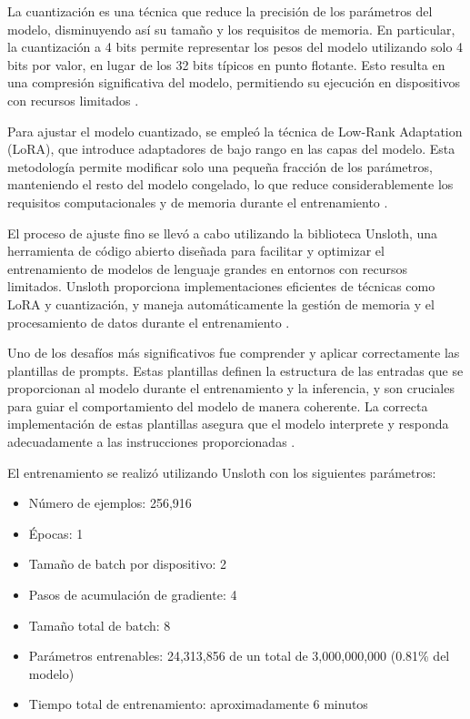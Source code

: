 \documentclass[../main.tex]{subfiles}
\begin{document}
La cuantización es una técnica que reduce la precisión de los parámetros del modelo, disminuyendo así su tamaño y los requisitos de memoria. En particular, la cuantización a 4 bits permite representar los pesos del modelo utilizando solo 4 bits por valor, en lugar de los 32 bits típicos en punto flotante. Esto resulta en una compresión significativa del modelo, permitiendo su ejecución en dispositivos con recursos limitados \parencite{huggingface_4bit}.

Para ajustar el modelo cuantizado, se empleó la técnica de Low-Rank Adaptation (LoRA), que introduce adaptadores de bajo rango en las capas del modelo. Esta metodología permite modificar solo una pequeña fracción de los parámetros, manteniendo el resto del modelo congelado, lo que reduce considerablemente los requisitos computacionales y de memoria durante el entrenamiento \parencite{hu2021lora}.

El proceso de ajuste fino se llevó a cabo utilizando la biblioteca Unsloth, una herramienta de código abierto diseñada para facilitar y optimizar el entrenamiento de modelos de lenguaje grandes en entornos con recursos limitados. Unsloth proporciona implementaciones eficientes de técnicas como LoRA y cuantización, y maneja automáticamente la gestión de memoria y el procesamiento de datos durante el entrenamiento \parencite{unsloth_docs}.

Uno de los desafíos más significativos fue comprender y aplicar correctamente las plantillas de prompts. Estas plantillas definen la estructura de las entradas que se proporcionan al modelo durante el entrenamiento y la inferencia, y son cruciales para guiar el comportamiento del modelo de manera coherente. La correcta implementación de estas plantillas asegura que el modelo interprete y responda adecuadamente a las instrucciones proporcionadas \parencite{huggingface_templates}.

El entrenamiento se realizó utilizando Unsloth con los siguientes parámetros:

\begin{itemize}
	\item Número de ejemplos: 256,916
	\item Épocas: 1
	\item Tamaño de batch por dispositivo: 2
	\item Pasos de acumulación de gradiente: 4
	\item Tamaño total de batch: 8
	\item Parámetros entrenables: 24,313,856 de un total de 3,000,000,000 (0.81\% del modelo)
	\item Tiempo total de entrenamiento: aproximadamente 6 minutos
\end{itemize}
\end{document}
